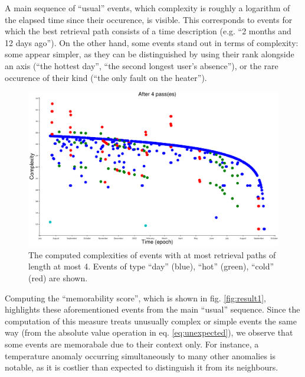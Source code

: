 \documentclass[conference]{IEEEtran}
\begin{document}
A main sequence of ``usual'' events, which complexity is roughly a logarithm of
the elapsed time since their occurence, is visible. This corresponds to events
for which the best retrieval path consists of a time description (e.g. ``2
months and 12 days ago''). On the other hand, some events stand out in terms of
complexity: some appear simpler, as they can be distinguished by using their
rank alongside an axis (``the hottest day'', ``the second longest user's
absence''), or the rare occurence of their kind (``the only fault on the heater'').

\begin{figure}[ht]
  \centering
  \includegraphics[width=\linewidth]{figures/complexities_computed}
  \caption{The computed complexities of events with at most retrieval paths of
    length at most 4. Events of type ``day'' (blue), ``hot'' (green), ``cold'' (red) are shown.}
  \label{fig:computed_cplx}
\end{figure}

Computing the ``memorability score'', which is shown in fig. \ref{fig:result1},
highlights these aforementioned events from the main ``usual'' sequence. Since
the computation of this measure treats unusually complex or simple events the
same way (from the absolute value operation in eq. \ref{eq:unexpected}), we
observe that some events are memorabale due to their context only. For instance,
a temperature anomaly occurring simultaneously to many other anomalies is
notable, as it is costlier than expected to distinguish it from its neighbours.
\end{document}
